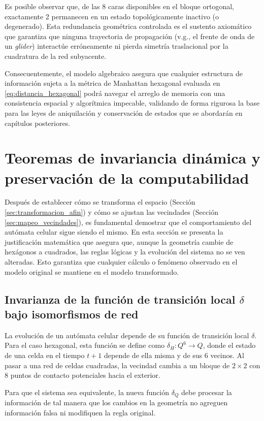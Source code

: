 Es posible observar que, de las 8 caras disponibles en el bloque ortogonal, exactamente 2 permanecen en un estado topológicamente inactivo (o degenerado). Esta redundancia geométrica controlada es el sustento axiomático que garantiza que ninguna trayectoria de propagación (v.g., el frente de onda de un \textit{glider}) interactúe erróneamente ni pierda simetría traslacional por la cuadratura de la red subyacente. 

Consecuentemente, el modelo algebraico asegura que cualquier estructura de información sujeta a la métrica de Manhattan hexagonal evaluada en \eqref{eq:distancia_hexagonal} podrá navegar el arreglo de memoria con una consistencia espacial y algorítmica impecable, validando de forma rigurosa la base para las leyes de aniquilación y conservación de estados que se abordarán en capítulos posteriores.


\section{Teoremas de invariancia dinámica y preservación de la computabilidad}
\label{sec:teoremas_invariancia}

Después de establecer cómo se transforma el espacio (Sección \ref{sec:transformacion_afin}) y cómo se ajustan las vecindades (Sección \ref{sec:mapeo_vecindades}), es fundamental demostrar que el comportamiento del autómata celular sigue siendo el mismo. En esta sección se presenta la justificación matemática que asegura que, aunque la geometría cambie de hexágonos a cuadrados, las reglas lógicas y la evolución del sistema no se ven alteradas. Esto garantiza que cualquier cálculo o fenómeno observado en el modelo original se mantiene en el modelo transformado.

\subsection{Invarianza de la función de transición local $\delta$ bajo isomorfismos de red}
\label{subsec:invarianza_funcion_transicion}

La evolución de un autómata celular depende de su función de transición local $\delta$. Para el caso hexagonal, esta función se define como $\delta_H: Q^6 \to Q$, donde el estado de una celda en el tiempo $t+1$ depende de ella misma y de sus 6 vecinos. Al pasar a una red de celdas cuadradas, la vecindad cambia a un bloque de $2 \times 2$ con 8 puntos de contacto potenciales hacia el exterior. 

Para que el sistema sea equivalente, la nueva función $\delta_Q$ debe procesar la información de tal manera que los cambios en la geometría no agreguen información falsa ni modifiquen la regla original.

